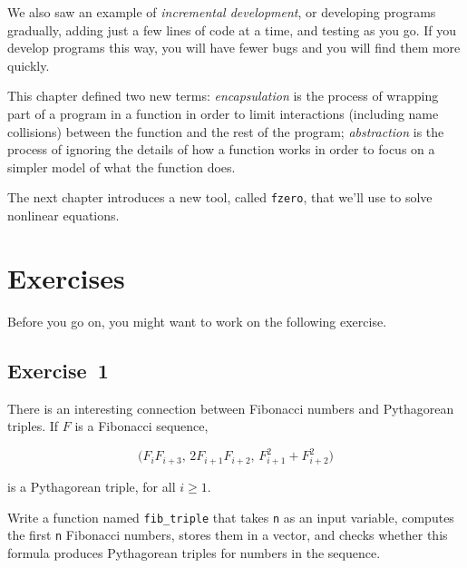 We also saw an example of \emph{incremental development}, or developing programs gradually, adding just a few lines of code at a time, and testing as you go.  If you develop programs this way, you will have fewer bugs and you will find them more quickly.

This chapter defined two new terms: \emph{encapsulation} is the process of wrapping part of a program in
a function in order to limit interactions (including name collisions)
between the function and the rest of the program; \emph{abstraction} is the process of ignoring the details of how a function works in order to focus on a simpler model of what the
function does.

The next chapter introduces a new tool, called \lstinline{fzero}, that we'll use to solve nonlinear equations.


\section{Exercises}

Before you go on, you might want to work on the following exercise.

\subsection{Exercise~1}

There is an interesting connection between Fibonacci numbers and
Pythagorean triples.  If $F$ is a Fibonacci sequence,

\begin{equation*}
\big(F_i F_{i+3}, \, 2 F_{i+1} F_{i+2}, \, F_{i+1}^2 + F_{i+2}^2 \big)
\end{equation*}

is a Pythagorean triple, for all $i \ge 1$.

Write a function named \lstinline{fib_triple} that
takes \lstinline{n} as an input variable, computes 
the first \lstinline{n} Fibonacci numbers, stores them in a vector,
and checks whether this formula produces Pythagorean triples for numbers in the sequence.




